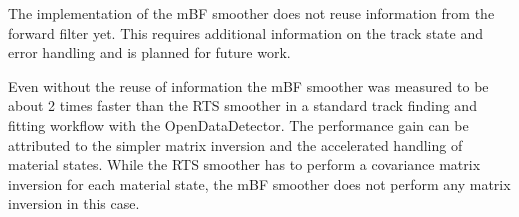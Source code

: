 The implementation of the mBF smoother does not reuse information from the forward filter yet. This requires additional information on the track state and error handling and is planned for future work.

Even without the reuse of information the mBF smoother was measured to be about 2 times faster than the RTS smoother in a standard track finding and fitting workflow with the OpenDataDetector. The performance gain can be attributed to the simpler matrix inversion and the accelerated handling of material states. While the RTS smoother has to perform a covariance matrix inversion for each material state, the mBF smoother does not perform any matrix inversion in this case.
